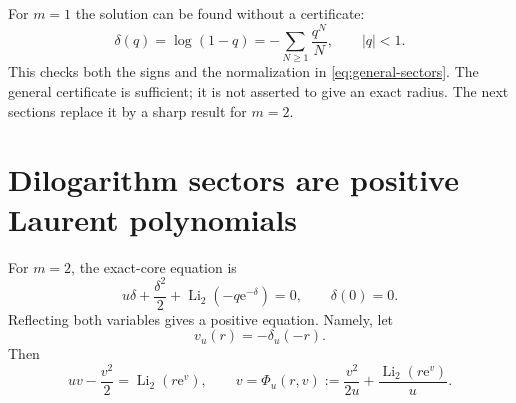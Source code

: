 \documentclass[11pt,a4paper]{article}
\theoremstyle{definition}\newtheorem{definition}[theorem]{Definition}
\theoremstyle{remark}\newtheorem{remark}[theorem]{Remark}
\newcommand{\Li}{\operatorname{Li}}
\newcommand{\ee}{\mathrm e}
\numberwithin{equation}{section}
\begin{document}
For $m=1$ the solution can be found without a certificate:
\begin{equation}\label{eq:m1inverse}
 \delta(q)=\log(1-q)=-\sum_{N\ge1}\frac{q^N}{N},\qquad |q|<1.
\end{equation}
This checks both the signs and the normalization in
\eqref{eq:general-sectors}. The general certificate is sufficient; it is
not asserted to give an exact radius. The next sections replace it by a
sharp result for $m=2$.

\section{Dilogarithm sectors are positive Laurent polynomials}\label{sec:dilog}

For $m=2$, the exact-core equation is
\begin{equation}\label{eq:dilog-delta}
 u\delta+\frac{\delta^2}{2}+\Li_2(-q\ee^{-\delta})=0,
 \qquad \delta(0)=0.
\end{equation}
Reflecting both variables gives a positive equation. Namely, let
\begin{equation}\label{eq:vdef}
 v_u(r)=-\delta_u(-r).
\end{equation}
Then
\begin{equation}\label{eq:positive-equation}
 uv-\frac{v^2}{2}=\Li_2(r\ee^v),\qquad
 v=\Phi_u(r,v):=\frac{v^2}{2u}+\frac{\Li_2(r\ee^v)}u.
\end{equation}
\end{document}
